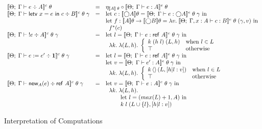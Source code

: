 \begin{figure}
\begin{displaymath}
  \begin{array}{lcl}
    \interpC{\judgeC{\Gamma}{e}{A}}\;\theta
    & = & 
    \eta_{\interp{A}\;\theta} \circ \interpE{\judgeE{\Gamma}{e}{A}}\;\theta
    \\
    \interpC{\judgeC{\Gamma}{\letv{x}{e}{c}}{B}}\;\theta\;\gamma
    & = & 
       \mbox{let }c : \interp{\monad{A}}\theta = \interpE{\judgeE{\Gamma}{e}{\monad{A}}}\;\theta\;\gamma \mbox{ in}\\
    && \mbox{let }f : \interp{A}\theta \to \interp{\monad{B}}\theta = 
                  \lambda v.\;\interpE{\judgeE{\Gamma, x:A}{c}{B}}\;\theta\; (\gamma, v) \mbox{ in}\\
    && \;\; f^{*}(c)
    \\
    \interpC{\judgeC{\Gamma}{!e}{A}}\;\theta\;\gamma
    & = &
       \mbox{let }l = \interpE{\judgeE{\Gamma}{e}{\reftype{A}}}\;\theta\;\gamma 
       \mbox{ in}\\
    && \;\;\lambda k.\;\lambda (L, h).\; 
        \left\{ \begin{array}{ll}
                  k\; (h\;l)\; (L, h) & \mbox{when } l \in L \\
                  \top                & \mbox{otherwise} \\
        \end{array}
        \right.
    \\
    \interpC{\judgeC{\Gamma}{e := e'}{\unittype}}\;\theta\;\gamma 
    & = & 
       \mbox{let }l = \interpE{\judgeE{\Gamma}{e}{\reftype{A}}}\;\theta\;\gamma 
    \mbox{ in}\\
    && \mbox{let }v = \interpE{\judgeE{\Gamma}{e'}{A}}\;\theta\;\gamma \mbox{ in}\\
    && \;\; \lambda k.\;\lambda (L, h).\; 
              \left\{ \begin{array}{ll}
                       k \unit (L, [h|l:v]) & \mbox{when } l \in L \\
                      \top                & \mbox{otherwise} \\
              \end{array}
              \right.
    \\
    \interpC{\judgeC{\Gamma}{\newref{A}{e}}{\reftype{A}}}\;\theta\;\gamma 
    & = & 
      \mbox{let }v = \interpE{\judgeE{\Gamma}{e}{A}}\;\theta\;\gamma \mbox{ in}\\
    && \;\;\lambda k.\;\lambda (L, h).\; \\
    && \;\;\qquad \mbox{let }l = (max(L) + 1, A) \mbox{ in}\\
    && \;\;\qquad k\;l\;(L \cup \setof{l}, [h|l:v])
    \\
  \end{array}
\end{displaymath}
\caption{Interpretation of Computations}
\label{lang-monadic-interp}
\end{figure}




